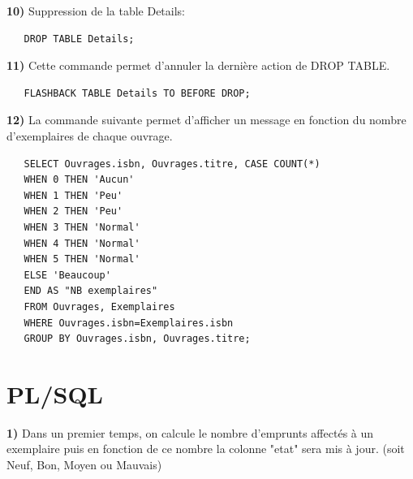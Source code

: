\documentclass[a4paper,12pt]{article}
\begin{document}
   \textbf {10)} Suppression  de la table Details:
   
   \begin{lstlisting}
   DROP TABLE Details;
   \end{lstlisting}   
   
   \textbf {11)} Cette commande permet d'annuler la dernière action de DROP TABLE.
   
   \begin{lstlisting}
   FLASHBACK TABLE Details TO BEFORE DROP;
   \end{lstlisting}   
   
   \textbf {12)} La commande suivante permet d'afficher un message en fonction du nombre d'exemplaires de chaque ouvrage.
   \begin{lstlisting}
   SELECT Ouvrages.isbn, Ouvrages.titre, CASE COUNT(*) 
   WHEN 0 THEN 'Aucun' 
   WHEN 1 THEN 'Peu' 
   WHEN 2 THEN 'Peu'
   WHEN 3 THEN 'Normal' 
   WHEN 4 THEN 'Normal' 
   WHEN 5 THEN 'Normal' 
   ELSE 'Beaucoup' 
   END AS "NB exemplaires" 
   FROM Ouvrages, Exemplaires 
   WHERE Ouvrages.isbn=Exemplaires.isbn 
   GROUP BY Ouvrages.isbn, Ouvrages.titre;
   \end{lstlisting}      
   
   \section {PL/SQL}
   
     
        \textbf {1)} Dans un premier temps, on calcule le nombre d'emprunts affectés à un exemplaire puis en fonction de ce nombre la colonne "etat" sera mis à jour. (soit Neuf, Bon, Moyen ou Mauvais)
         
\end{document}
